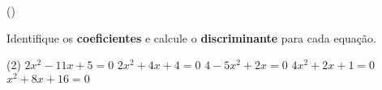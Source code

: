 \begin{question}[type=exam] ()%

Identifique os \textbf{coeficientes} e calcule o \textbf{discriminante} para cada equação.
\begin{tasks}(2)
        \task $2x^2-11x+5=0$
        \task $2x^2+4x+4=0$
        \task $4-5x^2+2x=0$
        \task $4x^2+2x+1=0$
        \task $x^2+8x+16=0$
    \end{tasks}
\end{question}